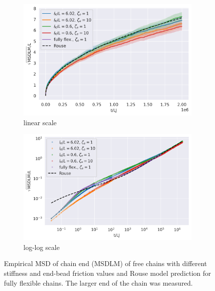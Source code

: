 \documentclass[
    paper=A4,pagesize=automedia,fontsize=12pt,
    BCOR=15mm,DIV=22,
    twoside,headinclude,footinclude=false,
    fleqn,             %
    bibliography=totocnumbered,          %
    listof=totoc,                %
    listof=flat,                 %
    cleardoublepage=empty      %
    numbers=endperiod
]{scrartcl}
\begin{document}
\begin{figure}[H]
    \centering
    \begin{subfigure}[b]{\textwidth}
        \centering
        \includegraphics[width=\textwidth]{17+18+19+20-exp-msd.png}
        \caption{linear scale}
        \label{fig:msd_free-normal}
    \end{subfigure}
    \begin{subfigure}[b]{\textwidth}
        \centering
        \includegraphics[width=\textwidth]{17+18+19+20-exp-msd-log.png}
        \caption{log-log scale}
        \label{fig:msd_free-log}
    \end{subfigure}
    \caption{   
        Empirical MSD of chain end (MSDLM) of free chains
        with different stiffness and end-bead friction values and
        Rouse model prediction for fully flexible chains.
        The larger end of the chain was measured.
    }
    \label{fig:msd_free}
\end{figure}
\end{document}
